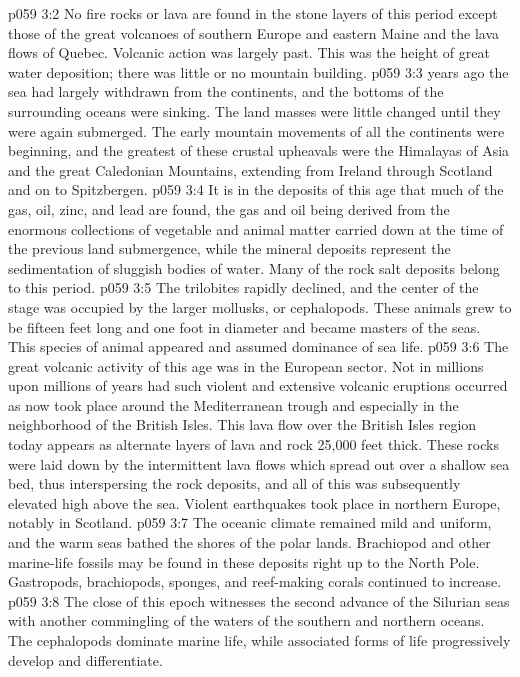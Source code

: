 \vs p059 3:2 No fire rocks or lava are found in the stone layers of this period except those of the great volcanoes of southern Europe and eastern Maine and the lava flows of Quebec. Volcanic action was largely past. This was the height of great water deposition; there was little or no mountain building.
\pc \vs p059 3:3  years ago the sea had largely withdrawn from the continents, and the bottoms of the surrounding oceans were sinking. The land masses were little changed until they were again submerged. The early mountain movements of all the continents were beginning, and the greatest of these crustal upheavals were the Himalayas of Asia and the great Caledonian Mountains, extending from Ireland through Scotland and on to Spitzbergen.
\vs p059 3:4 It is in the deposits of this age that much of the gas, oil, zinc, and lead are found, the gas and oil being derived from the enormous collections of vegetable and animal matter carried down at the time of the previous land submergence, while the mineral deposits represent the sedimentation of sluggish bodies of water. Many of the rock salt deposits belong to this period.
\vs p059 3:5 The trilobites rapidly declined, and the center of the stage was occupied by the larger mollusks, or cephalopods. These animals grew to be fifteen feet long and one foot in diameter and became masters of the seas. This species of animal appeared  and assumed dominance of sea life.
\vs p059 3:6 The great volcanic activity of this age was in the European sector. Not in millions upon millions of years had such violent and extensive volcanic eruptions occurred as now took place around the Mediterranean trough and especially in the neighborhood of the British Isles. This lava flow over the British Isles region today appears as alternate layers of lava and rock 25,000 feet thick. These rocks were laid down by the intermittent lava flows which spread out over a shallow sea bed, thus interspersing the rock deposits, and all of this was subsequently elevated high above the sea. Violent earthquakes took place in northern Europe, notably in Scotland.
\vs p059 3:7 The oceanic climate remained mild and uniform, and the warm seas bathed the shores of the polar lands. Brachiopod and other marine\hyp{}life fossils may be found in these deposits right up to the North Pole. Gastropods, brachiopods, sponges, and reef\hyp{}making corals continued to increase.
\vs p059 3:8 The close of this epoch witnesses the second advance of the Silurian seas with another commingling of the waters of the southern and northern oceans. The cephalopods dominate marine life, while associated forms of life progressively develop and differentiate.
